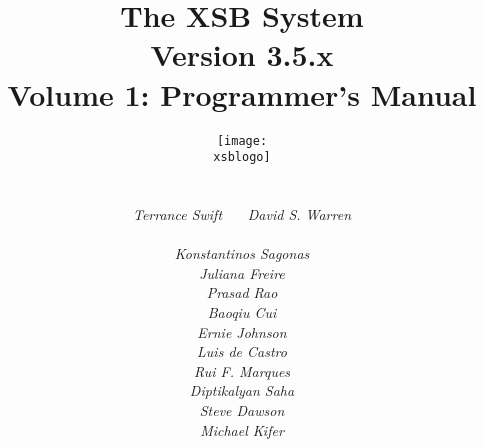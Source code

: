 \documentclass[12pt]{report}
\newcommand{\version}{Version 3.5}
\newcommand{\xsblogo}{{xsb-logo}}
\begin{document}
\title{\bf The XSB System \\ \version .x\\ Volume 1: Programmer's Manual}

\author{{\texttt{[image: \\xsblogo]}}\\
        \ \\ \ \\
        {\em Terrance Swift} \ \ \ 
        {\em David S. Warren} \\ 
        \ \\
        {\em Konstantinos Sagonas} \\
        {\em Juliana Freire} \\
        {\em Prasad Rao} \\
        {\em Baoqiu Cui} \\
        {\em Ernie Johnson} \\
        {\em Luis de Castro} \\
        {\em Rui F. Marques} \\
        {\em Diptikalyan Saha} \\
        {\em Steve Dawson} \\
        {\em Michael Kifer} \\
        \ \\
}

\maketitle

\thispagestyle{empty}


\newpage
\thispagestyle{empty}
\tableofcontents
\newpage        %
  




















\appendix



% 





\printindex
\printindex[pred]
\end{document}
